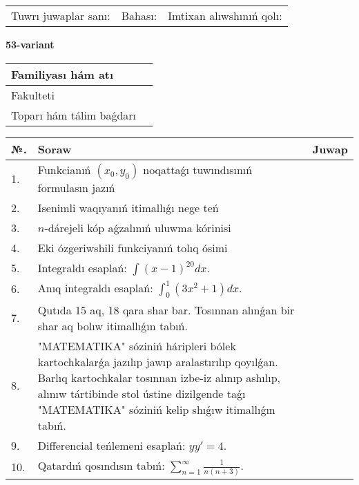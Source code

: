\documentclass{article}
\begin{document}
\vspace{1cm}

\begin{tabular}{ c c c }
Tuwrı juwaplar sanı: \underline{\hspace{2cm}} & Bahası: \underline{\hspace{2cm}} & Imtixan alıwshınıń qolı: \underline{\hspace{2cm}} \\
\end{tabular}

\newpage

\begin{center}\textbf{53-variant}\end{center}

\bgroup
\def\arraystretch{1.5}
\begin{tabular}{ |m{6cm}|m{10cm}| }
  \hline
  Familiyası hám atı & \\
  \hline
  Fakulteti &\\
  \hline
  Toparı hám tálim baǵdarı & \\
  \hline
\end{tabular}
\egroup

\vspace{0.5cm}

\bgroup
\def\arraystretch{2}
\begin{tabular}{ |l|m{8cm}|m{7cm}| }
  \hline
  №. & Soraw & Juwap \\
  \hline
  1. & Funkcianıń $(x_{0}, y_{0})$ noqattaǵı tuwındısınıń formulasın jazıń &  \\
  \hline
  2. & Isenimli waqıyanıń itimallıǵı nege teń &  \\
  \hline
  3. & $n$-dárejeli kóp aǵzalınıń uluwma kórinisi &  \\
  \hline
  4. & Eki ózgeriwshili funkciyanıń tolıq ósimi &  \\
  \hline
  5. & Integraldı esaplań: $\displaystyle\int (x - 1)^{20}dx$. &  \\
  \hline
  6. & Anıq integraldı esaplań: $\displaystyle\int_{0}^{1}{(3x^{2} + 1)dx}$. &  \\
  \hline
  7. & Qutıda 15 aq, 18 qara shar bar. Tosınnan alınǵan bir shar aq bolıw itimallıǵın tabıń. &  \\
  \hline
  8. & "MATEMATIKA" sóziniń háripleri bólek kartochkalarǵa jazılıp jawıp aralastırılıp qoyılǵan. Barlıq kartochkalar tosınnan izbe-iz alınıp ashılıp, alınıw tártibinde stol ústine dizilgende taǵı "MATEMATIKA" sóziniń kelip shıǵıw itimallıǵın tabıń. &  \\
  \hline
  9. & Differencial teńlemeni esaplań: $yy'= 4$. &  \\
  \hline
  10. & Qatardıń qosındısın tabıń: $\displaystyle\sum_{n = 1}^{\infty}\frac{1}{n(n + 3)}$. &  \\
  \hline
\end{tabular}
\egroup
\end{document}
